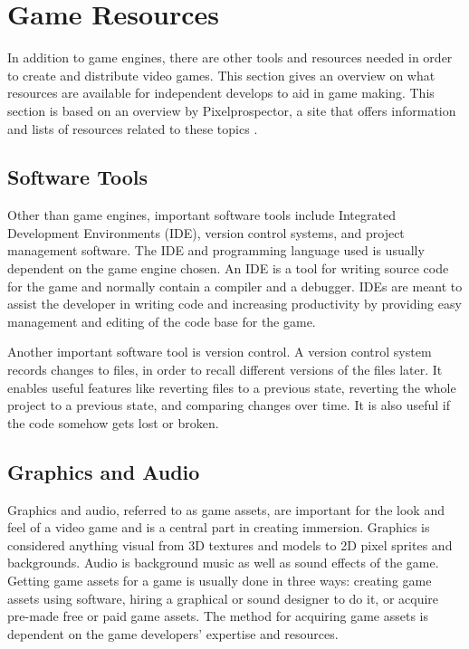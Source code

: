 \section{Game Resources}
In addition to game engines, there are other tools and resources needed in order to create and distribute video games. This section gives an overview on what resources are available for independent develops to aid in game making. This section is based on an overview by Pixelprospector, a site that offers information and lists of resources related to these topics \cite{pixel2016prospector}.

\subsection{Software Tools}
Other than game engines, important software tools include Integrated Development Environments (IDE), version control systems, and project management software. The IDE and programming language used is usually dependent on the game engine chosen. An IDE is a tool for writing source code for the game and normally contain a compiler and a debugger. IDEs are meant to assist the developer in writing code and increasing productivity by providing easy management and editing of the code base for the game.

Another important software tool is version control. A version control system records changes to files, in order to recall different versions of the files later. It enables useful features like reverting files to a previous state, reverting the whole project to a previous state, and comparing changes over time. It is also useful if the code somehow gets lost or broken. \cite{git2016vcs}

\subsection{Graphics and Audio}
Graphics and audio, referred to as game assets, are important for the look and feel of a video game and is a central part in creating immersion. Graphics is considered anything visual from 3D textures and models to 2D pixel sprites and backgrounds. Audio is background music as well as sound effects of the game. Getting game assets for a game is usually done in three ways: creating game assets using software, hiring a graphical or sound designer to do it, or acquire pre-made free or paid game assets. The method for acquiring game assets is dependent on the game developers' expertise and resources.

